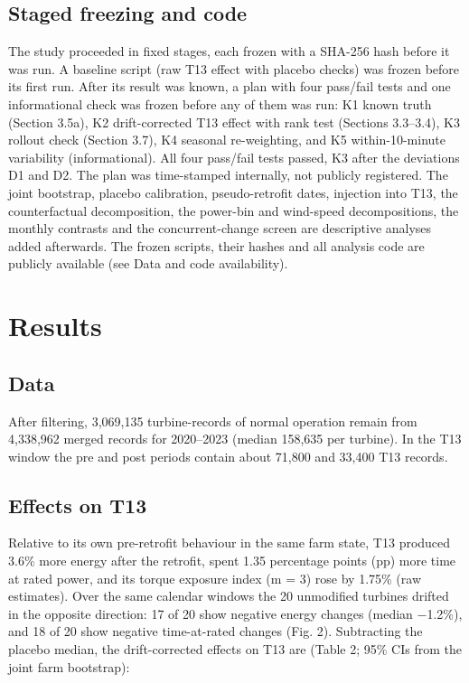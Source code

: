\documentclass[preprint,12pt]{elsarticle}
\begin{document}
\subsection{Staged freezing and code}

The study proceeded in fixed stages, each frozen with a SHA-256 hash before it was run. A baseline script (raw T13 effect with placebo checks) was frozen before its first run. After its result was known, a plan with four pass/fail tests and one informational check was frozen before any of them was run: K1 known truth (Section 3.5a), K2 drift-corrected T13 effect with rank test (Sections 3.3--3.4), K3 rollout check (Section 3.7), K4 seasonal re-weighting, and K5 within-10-minute variability (informational). All four pass/fail tests passed, K3 after the deviations D1 and D2. The plan was time-stamped internally, not publicly registered. The joint bootstrap, placebo calibration, pseudo-retrofit dates, injection into T13, the counterfactual decomposition, the power-bin and wind-speed decompositions, the monthly contrasts and the concurrent-change screen are descriptive analyses added afterwards. The frozen scripts, their hashes and all analysis code are publicly available (see Data and code availability).

\section{Results}

\subsection{Data}

After filtering, 3,069,135 turbine-records of normal operation remain from 4,338,962 merged records for 2020--2023 (median 158,635 per turbine). In the T13 window the pre and post periods contain about 71,800 and 33,400 T13 records.

\subsection{Effects on T13}

Relative to its own pre-retrofit behaviour in the same farm state, T13 produced 3.6\% more energy after the retrofit, spent 1.35 percentage points (pp) more time at rated power, and its torque exposure index (m = 3) rose by 1.75\% (raw estimates). Over the same calendar windows the 20 unmodified turbines drifted in the opposite direction: 17 of 20 show negative energy changes (median −1.2\%), and 18 of 20 show negative time-at-rated changes (Fig. 2). Subtracting the placebo median, the drift-corrected effects on T13 are (Table 2; 95\% CIs from the joint farm bootstrap):
\end{document}
